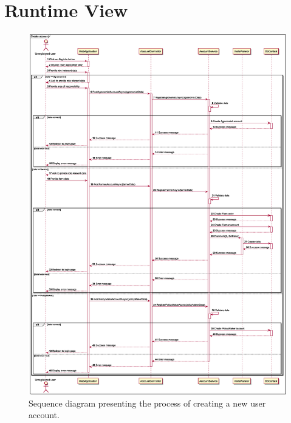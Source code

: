 \section{Runtime View}

\begin{figure}[H]
    \centering
    \includegraphics[height=\textheight, width=\textwidth, keepaspectratio, origin=c]{diagrams/sequence/create_account}
    \caption{Sequence diagram presenting the process of creating a new user account.}
    \label{fig:sd_create_account}
\end{figure}

